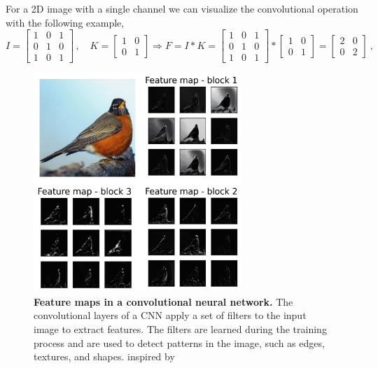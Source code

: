 For a 2D image with a single channel we can visualize the convolutional
operation with the following example,
\begin{equation}
  I = \begin{bmatrix}
    1 & 0 & 1 \\
    0 & 1 & 0 \\
    1 & 0 & 1
  \end{bmatrix} \, ,
  \quad
  K = \begin{bmatrix}
    1 & 0 \\
    0 & 1
  \end{bmatrix}
  \Longrightarrow
  F=I \ast K =
  \begin{bmatrix}
    1 & 0 & 1 \\
    0 & 1 & 0 \\
    1 & 0 & 1
  \end{bmatrix}
  \ast
  \begin{bmatrix}
    1 & 0 \\
    0 & 1
  \end{bmatrix}
  =
  \begin{bmatrix}
    2 & 0 \\
    0 & 2
  \end{bmatrix}
  \ ,
\end{equation}

\begin{figure}[H]
  \centering
  \includegraphics[width=0.7\textwidth]{Figures/feature_maps.pdf}
  \caption[Feature maps in a convolutional neural network]{
    \textbf{Feature maps in a convolutional neural network.} The convolutional
    layers of a CNN apply a set of filters to the input image to extract
    features. The filters are learned during the training process and are used
    to detect patterns in the image, such as edges, textures, and shapes.
    inspired by \cite{Brownlee2019}}
  \label{fig:feature_maps}
\end{figure}

